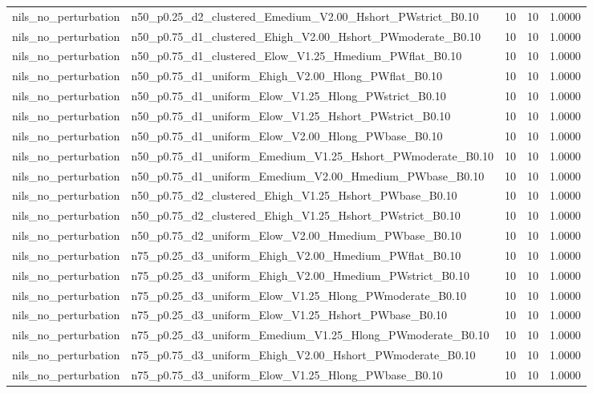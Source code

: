 \begin{tabular}{llrrr}
nils_no_perturbation & n50_p0.25_d2_clustered_Emedium_V2.00_Hshort_PWstrict_B0.10 & 10 & 10 & 1.0000 \\
nils_no_perturbation & n50_p0.75_d1_clustered_Ehigh_V2.00_Hshort_PWmoderate_B0.10 & 10 & 10 & 1.0000 \\
nils_no_perturbation & n50_p0.75_d1_clustered_Elow_V1.25_Hmedium_PWflat_B0.10 & 10 & 10 & 1.0000 \\
nils_no_perturbation & n50_p0.75_d1_uniform_Ehigh_V2.00_Hlong_PWflat_B0.10 & 10 & 10 & 1.0000 \\
nils_no_perturbation & n50_p0.75_d1_uniform_Elow_V1.25_Hlong_PWstrict_B0.10 & 10 & 10 & 1.0000 \\
nils_no_perturbation & n50_p0.75_d1_uniform_Elow_V1.25_Hshort_PWstrict_B0.10 & 10 & 10 & 1.0000 \\
nils_no_perturbation & n50_p0.75_d1_uniform_Elow_V2.00_Hlong_PWbase_B0.10 & 10 & 10 & 1.0000 \\
nils_no_perturbation & n50_p0.75_d1_uniform_Emedium_V1.25_Hshort_PWmoderate_B0.10 & 10 & 10 & 1.0000 \\
nils_no_perturbation & n50_p0.75_d1_uniform_Emedium_V2.00_Hmedium_PWbase_B0.10 & 10 & 10 & 1.0000 \\
nils_no_perturbation & n50_p0.75_d2_clustered_Ehigh_V1.25_Hshort_PWbase_B0.10 & 10 & 10 & 1.0000 \\
nils_no_perturbation & n50_p0.75_d2_clustered_Ehigh_V1.25_Hshort_PWstrict_B0.10 & 10 & 10 & 1.0000 \\
nils_no_perturbation & n50_p0.75_d2_uniform_Elow_V2.00_Hmedium_PWbase_B0.10 & 10 & 10 & 1.0000 \\
nils_no_perturbation & n75_p0.25_d3_uniform_Ehigh_V2.00_Hmedium_PWflat_B0.10 & 10 & 10 & 1.0000 \\
nils_no_perturbation & n75_p0.25_d3_uniform_Ehigh_V2.00_Hmedium_PWstrict_B0.10 & 10 & 10 & 1.0000 \\
nils_no_perturbation & n75_p0.25_d3_uniform_Elow_V1.25_Hlong_PWmoderate_B0.10 & 10 & 10 & 1.0000 \\
nils_no_perturbation & n75_p0.25_d3_uniform_Elow_V1.25_Hshort_PWbase_B0.10 & 10 & 10 & 1.0000 \\
nils_no_perturbation & n75_p0.25_d3_uniform_Emedium_V1.25_Hlong_PWmoderate_B0.10 & 10 & 10 & 1.0000 \\
nils_no_perturbation & n75_p0.75_d3_uniform_Ehigh_V2.00_Hshort_PWmoderate_B0.10 & 10 & 10 & 1.0000 \\
nils_no_perturbation & n75_p0.75_d3_uniform_Elow_V1.25_Hlong_PWbase_B0.10 & 10 & 10 & 1.0000 \\

\end{tabular}
